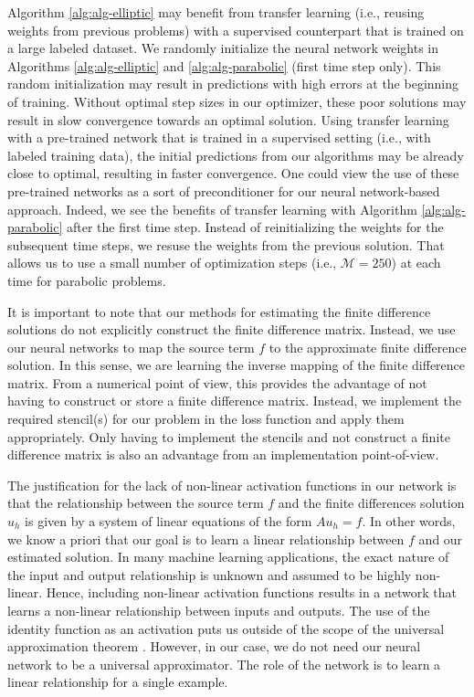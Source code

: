 \documentclass[preprint,12pt]{elsarticle}
\begin{document}
Algorithm \ref{alg:alg-elliptic} may benefit from transfer learning (i.e., reusing weights from previous problems) with a supervised counterpart that is trained on a large labeled dataset. We randomly initialize the neural network weights in Algorithms \ref{alg:alg-elliptic} and \ref{alg:alg-parabolic} (first time step only). This random initialization may result in predictions with high errors at the beginning of training. Without optimal step sizes in our optimizer, these poor solutions may result in slow convergence towards an optimal solution. Using transfer learning with a pre-trained network that is trained in a supervised setting (i.e., with labeled training data), the initial predictions from our algorithms may be already close to optimal, resulting in faster convergence. One could view the use of these pre-trained networks as a sort of preconditioner for our neural network-based approach. Indeed, we see the benefits of transfer learning with Algorithm \ref{alg:alg-parabolic} after the first time step. Instead of reinitializing the weights for the subsequent time steps, we resuse the weights from the previous solution. That allows us to use a small number of optimization steps (i.e., $\mathcal{M} = 250$) at each time for parabolic problems.  

It is important to note that our methods for estimating the finite difference solutions do not explicitly construct the finite difference matrix. Instead, we use our neural networks to map the source term $f$ to the approximate finite difference solution. In this sense, we are learning the inverse mapping of the finite difference matrix. From a numerical point of view, this provides the advantage of not having to construct or store a finite difference matrix. Instead, we implement the required stencil(s) for our problem in the loss function and apply them appropriately. Only having to implement the stencils and not construct a finite difference matrix is also an advantage from an implementation point-of-view. 

The justification for the lack of non-linear activation functions in our network is that the relationship between the source term $f$ and the finite differences solution $u_h$ is given by a system of linear equations of the form $Au_h = f$. In other words, we know a priori that our goal is to learn a linear relationship between $f$ and our estimated solution. In many machine learning applications, the exact nature of the input and output relationship is unknown and assumed to be highly non-linear. Hence, including non-linear activation functions results in a network that learns a non-linear relationship between inputs and outputs. The use of the identity function as an activation puts us outside of the scope of the universal approximation theorem \cite{horni1989multilayer, cybenko1989approximation, funahashi1989approximate}. However, in our case, we do not need our neural network to be a universal approximator. The role of the network is to learn a linear relationship for a single example.
\end{document}
